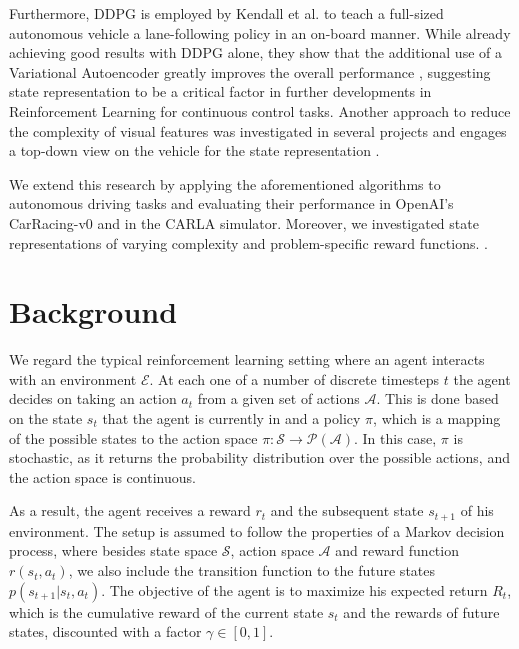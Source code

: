 \documentclass[letterpaper, 10 pt, conference]{ieeeconf}  %
\begin{document}
Furthermore, DDPG is  employed  by Kendall et al. to teach a full-sized autonomous vehicle a lane-following policy in an on-board manner. While already achieving good results with DDPG alone, they show that the additional use of a Variational Autoencoder greatly improves the overall performance \cite{kendall2019learning}, suggesting state representation to be a critical factor in further developments in Reinforcement Learning for continuous control tasks. Another approach to reduce the complexity of visual features was investigated in several projects and engages a top-down view on the vehicle for the state representation \cite{DBLP:journals/corr/abs-1812-03079}\cite{DBLP:journals/corr/abs-1903-00640}\cite{Djuric2018ShorttermMP}.

We extend this research by applying the aforementioned algorithms to autonomous driving tasks and evaluating their performance in OpenAI's CarRacing-v0 and in the CARLA simulator. Moreover, we investigated state representations of varying complexity and problem-specific reward functions. \cite{dosovitskiy2017carla}.


\section{Background}

We regard the typical reinforcement learning setting where an agent interacts with an environment $\mathcal{E}$. At each one of a number of discrete timesteps $t$ the agent decides on taking an action $a_t$ from a given set of actions $\mathcal{A}$. This is done based on the state $s_t$ that the agent is currently in and a policy $\pi$, which is a mapping of the possible states to the action space $\pi: \mathcal{S} \rightarrow \mathcal{P}(\mathcal{A})$. In this case, $\pi$ is stochastic, as it returns the probability distribution over the possible actions, and the action space is continuous.

As a result, the agent receives a reward $r_t$ and the subsequent state $s_{t+1}$ of his environment. The setup is assumed to follow the properties of a Markov decision process, where besides state space $\mathcal{S}$, action space $\mathcal{A}$ and reward function $r(s_t,a_t)$, we also include the transition function to the future states $p(s_{t+1}|s_t,a_t)$. The objective of the agent is to maximize his expected return $R_t$, which is the cumulative reward of the current state $s_t$ and the rewards of future states, discounted with a factor $\gamma \in [0,1]$.
\end{document}
